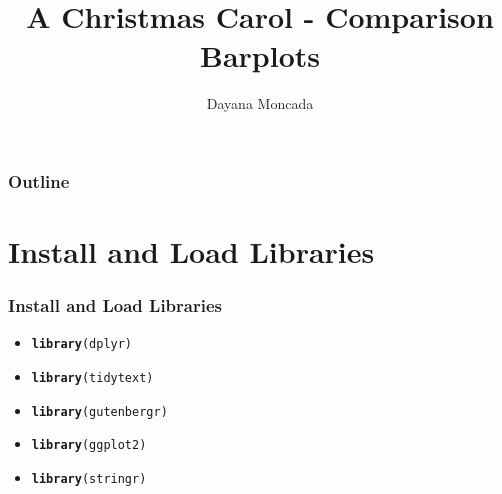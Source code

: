 \documentclass{beamer}\usepackage[]{graphicx}\usepackage[]{color}
\makeatletter
\newcommand{\hlstd}[1]{\textcolor[rgb]{0.345,0.345,0.345}{#1}}%
\newcommand{\hlkwd}[1]{\textcolor[rgb]{0.737,0.353,0.396}{\textbf{#1}}}%
\newenvironment{kframe}{%
 \def\at@end@of@kframe{}%
 \ifinner\ifhmode%
  \def\at@end@of@kframe{\end{minipage}}%
  \begin{minipage}{\columnwidth}%
 \fi\fi%
 \def\FrameCommand##1{\hskip\@totalleftmargin \hskip-\fboxsep
 \colorbox{shadecolor}{##1}\hskip-\fboxsep
     \hskip-\linewidth \hskip-\@totalleftmargin \hskip\columnwidth}%
 \MakeFramed {\advance\hsize-\width
   \@totalleftmargin\z@ \linewidth\hsize
   \@setminipage}}%
 {\par\unskip\endMakeFramed%
 \at@end@of@kframe}
\newenvironment{knitrout}{}{} %
\makeatother
\begin{document}
\title{A Christmas Carol - Comparison Barplots}
\author{Dayana Moncada}

\begin{frame}
  \titlepage
\end{frame}

\begin{frame}
  \frametitle{Outline}
    \tableofcontents
\end{frame}

\section{Install and Load Libraries}
\begin{frame}[fragile]
  \frametitle{Install and Load Libraries}
    \begin{itemize}
      \item
\begin{knitrout}
\color{fgcolor}\begin{kframe}
\begin{alltt}
\hlkwd{library}\hlstd{(dplyr)}
\end{alltt}
\end{kframe}
\end{knitrout}
      \item
\begin{knitrout}
\color{fgcolor}\begin{kframe}
\begin{alltt}
\hlkwd{library}\hlstd{(tidytext)}
\end{alltt}
\end{kframe}
\end{knitrout}
    \item
\begin{knitrout}
\color{fgcolor}\begin{kframe}
\begin{alltt}
\hlkwd{library}\hlstd{(gutenbergr)}
\end{alltt}
\end{kframe}
\end{knitrout}
    \item
\begin{knitrout}
\color{fgcolor}\begin{kframe}
\begin{alltt}
\hlkwd{library}\hlstd{(ggplot2)}
\end{alltt}
\end{kframe}
\end{knitrout}
    \item
\begin{knitrout}
\color{fgcolor}\begin{kframe}
\begin{alltt}
\hlkwd{library}\hlstd{(stringr)}
\end{alltt}
\end{kframe}
\end{knitrout}
    
    \end{itemize}
\end{frame}
\end{document}
